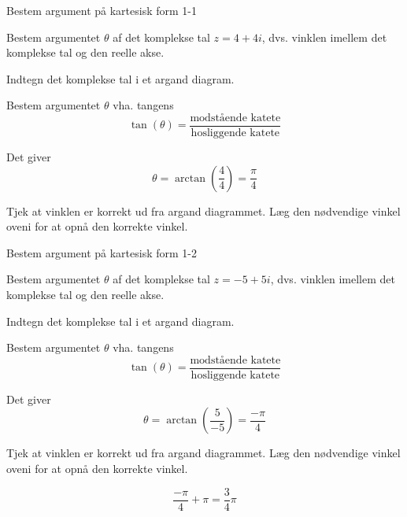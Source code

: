 \documentclass{article}
\begin{document}
\tableofcontents
\newpage

\begin{exercise}{Bestem argument på kartesisk form 1-1}

Bestem argumentet $\theta$ af det komplekse tal $z=4+4i$, dvs. vinklen imellem det komplekse tal og den reelle akse.



\hint 

Indtegn det komplekse tal i et argand diagram.


\hint

Bestem argumentet $\theta$ vha. tangens
\[
\tan(\theta)=\frac{\textrm{modstående katete}}{\textrm{hosliggende katete}}
\]

\hint 

Det giver
\[
\theta = \arctan \left(\frac{4}{4}\right) = \frac{\pi}{4}
\]

\hint

Tjek at vinklen er korrekt ud fra argand diagrammet. Læg den nødvendige vinkel oveni for at opnå den korrekte vinkel. 


\end{exercise}

\newpage

\begin{exercise}{Bestem argument på kartesisk form 1-2}
	
	Bestem argumentet $\theta$ af det komplekse tal $z=-5+5i$, dvs. vinklen imellem det komplekse tal og den reelle akse.
	
	
	
	\hint 
	
	Indtegn det komplekse tal i et argand diagram.
	
	
	\hint
	
	Bestem argumentet $\theta$ vha. tangens
	\[
	\tan(\theta)=\frac{\textrm{modstående katete}}{\textrm{hosliggende katete}}
	\]
	
	\hint 
	
	Det giver
	\[
	\theta = \arctan \left(\frac{5}{-5}\right) = \frac{-\pi}{4}
	\]
	
	\hint
	
	Tjek at vinklen er korrekt ud fra argand diagrammet. Læg den nødvendige vinkel oveni for at opnå den korrekte vinkel. 
	
	\[
	\frac{-\pi}{4} + \pi = \frac{3}{4} \pi
	\]
	
\end{exercise}
\end{document}
